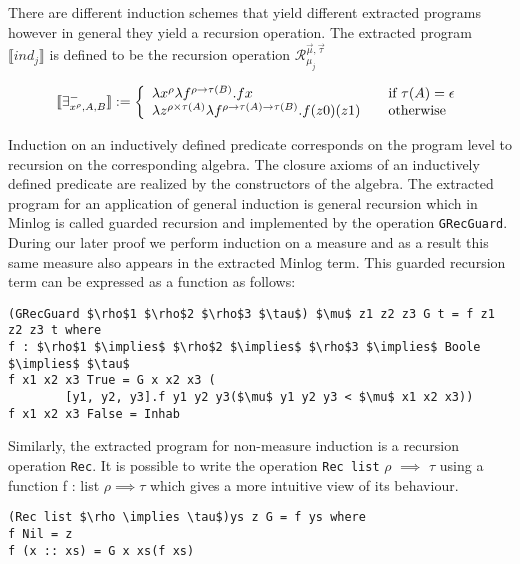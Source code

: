 There are different induction schemes  that yield different extracted programs however in general they yield a recursion operation. The extracted program $\llbracket ind_j \rrbracket$ is defined to be the recursion operation $\mathcal{R}^{\vec{\mu},\vec{\tau}}_{\mu_j}$


\[ \llbracket \exists^{-}_{x^{\rho}, A, B} \rrbracket := \left\{ 
\begin{array}{l l}
\lambda x^{\rho} \lambda f^{\rho \to \tau (B)}. f x  & \quad \text{if $\tau (A) = \epsilon$} \\ 
\lambda z^{\rho \times \tau (A)} \lambda f^{\rho \to \tau (A) \to \tau (B)}. f
(z0) (z1) & \quad \text{otherwise} \\
\end{array} \right.
\]


Induction on an inductively defined predicate corresponds on the program level  to recursion on the corresponding algebra. The closure axioms of an inductively defined predicate are realized by the constructors of the algebra. The extracted program for an application of general induction is general recursion which in Minlog is called guarded recursion and implemented by the operation \texttt{GRecGuard}. During our later proof we perform induction on a measure and as a result this same measure also appears in the extracted Minlog term.  This guarded recursion term can be expressed as a function as follows:

\begin{lstlisting}[caption = The Guarded Recursion Operation Used in the Minlog System, mathescape]
(GRecGuard $\rho$1 $\rho$2 $\rho$3 $\tau$) $\mu$ z1 z2 z3 G t = f z1 z2 z3 t where
f : $\rho$1 $\implies$ $\rho$2 $\implies$ $\rho$3 $\implies$ Boole $\implies$ $\tau$
f x1 x2 x3 True = G x x2 x3 (
        [y1, y2, y3].f y1 y2 y3($\mu$ y1 y2 y3 < $\mu$ x1 x2 x3))
f x1 x2 x3 False = Inhab
\end{lstlisting}


Similarly, the extracted program for non-measure induction is a recursion operation \texttt{Rec}. It is possible to write the operation \texttt{Rec list} $\rho$ $\implies$ $\tau$ using a function
f : list $\rho \implies \tau$ which gives a more intuitive view of its behaviour.
\begin{lstlisting}[caption = The Recursion Operation Used in the Minlog System ,mathescape]
(Rec list $\rho \implies \tau$)ys z G = f ys where
f Nil = z
f (x :: xs) = G x xs(f xs)
\end{lstlisting}


